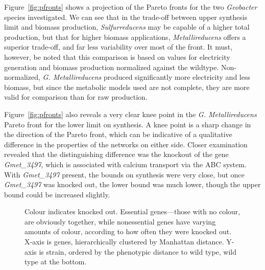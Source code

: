 \documentclass[a4paper,11pt]{article}
\begin{document}
Figure~\ref{fig:pfronts} shows a projection of the Pareto fronts for the two {\it Geobacter} species investigated. We can see that in the trade-off between upper synthesis limit and biomass production, {\it Sulfurreducens} may be capable of a higher total production, but that for higher biomass applications, {\it Metallireducens }offers a superior trade-off, and far less variability over most of the front. It must, however, be noted that this comparison is based on values for electricity generation and biomass production normalized against the wildtype. Non-normalized, {\it G. Metallireducens} produced significantly more electricity and less biomass, but since the metabolic models used are not complete, they are more valid for comparison than for raw production.

Figure~\ref{fig:pfronts} also reveals a very clear knee point in the {\it G. Metallireducens} Pareto front for the lower limit on synthesis. A knee point is a sharp change in the direction of the Pareto front, which can be indicative of a qualitative difference in the properties of the networks on either side. Closer examination revealed that the distinguishing difference was the knockout of the gene {\it Gmet\_3497}, which is associated with calcium transport via the ABC system. With {\it Gmet\_3497} present, the bounds on synthesis were very close, but once {\it Gmet\_3497} was knocked out, the lower bound was much lower, though the upper bound could be increased slightly.

\begin{figure}[!htb]
\caption{Colour indicates knocked out. Essential genes---those with no colour, are obviously together, while nonessential genes have varying amounts of colour, according to how often they were knocked out. X-axis is genes, hierarchically clustered by Manhattan distance. Y-axis is strain, ordered by the phenotypic distance to wild type, wild type at the bottom. \label{fig:heatmap}} 
\end{figure}
\end{document}

